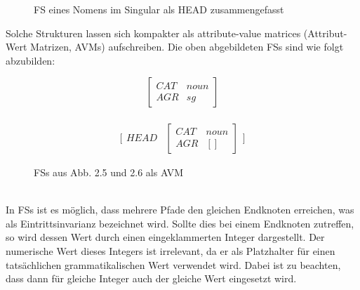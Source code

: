 \documentclass[12pt]{report}
\begin{document}
\begin{figure}[h!]
\begin{center}
\caption{FS eines Nomens im Singular als HEAD zusammengefasst \cite{cop04}}
\end{center}
\end{figure}

Solche Strukturen lassen sich kompakter als attribute-value matrices (Attribut-Wert Matrizen, AVMs) aufschreiben. Die oben abgebildeten FSs sind wie folgt abzubilden:
\\
\begin{figure}[h!]
\begin{displaymath}
\begin{bmatrix} 
CAT & noun \\
AGR & sg 
\end{bmatrix} 
\end{displaymath}
\\
\begin{displaymath}
\bigg[
\begin{matrix}
HEAD &
\begin{bmatrix} 
CAT & noun \\
AGR & [] 
\end{bmatrix} 
\end{matrix}
\bigg]
\end{displaymath}
\caption{FSs aus Abb. 2.5 und 2.6 als AVM \cite{cop04}}
\end{figure}
\\

In FSs ist es möglich, dass mehrere Pfade den gleichen Endknoten erreichen, was als Eintrittsinvarianz bezeichnet wird. Sollte dies bei einem Endknoten zutreffen, so wird dessen Wert durch einen eingeklammerten Integer dargestellt. Der numerische Wert dieses Integers ist irrelevant, da er als Platzhalter für einen tatsächlichen grammatikalischen Wert verwendet wird. Dabei ist zu beachten, dass dann für gleiche Integer auch der gleiche Wert eingesetzt wird.
\end{document}
